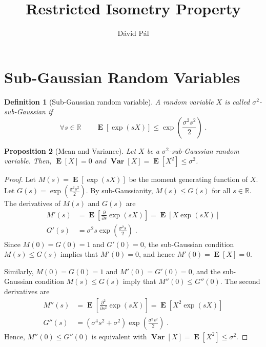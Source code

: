 \documentclass[12pt]{article}
\newtheorem{definition}{Definition}
\newtheorem{proposition}[definition]{Proposition}
\newcommand{\R}{\mathbb{R}}
\DeclareMathOperator*{\Var}{\mathbf{Var}}
\DeclareMathOperator*{\Exp}{\mathbf{E}}
\begin{document}
\title{Restricted Isometry Property}
\author{D\'avid P\'al}
\maketitle

\section{Sub-Gaussian Random Variables}

\begin{definition}[Sub-Gaussian random variable]
A random variable $X$ is called \emph{$\sigma^2$-sub-Gaussian} if
$$
\forall s \in \R \qquad \Exp\left[ \exp \left( s X \right) \right] \le \exp\left( \frac{\sigma^2 s^2}{2} \right) \; .
$$
\end{definition}

\begin{proposition}[Mean and Variance]
\label{proposition:sub-gaussian-mean-and-variance}
Let $X$ be a $\sigma^2$-sub-Gaussian random variable.
Then, $\Exp[X] = 0$ and $\Var[X] = \Exp[X^2] \le \sigma^2$.
\end{proposition}

\begin{proof}
Let $M(s) = \Exp[\exp(sX)]$ be the moment generating function of $X$.
Let $G(s) = \exp\left( \frac{\sigma^2 s^2}{2} \right)$.
By sub-Gaussianity, $M(s) \le G(s)$ for all $s \in \R$.
The derivatives of $M(s)$ and $G(s)$ are
\begin{align*}
M'(s) & = \Exp\left[ \frac{\partial}{\partial s}  \exp(sX) \right] = \Exp[X \exp(sX)] \\
G'(s) & = \sigma^2 s \exp\left( \frac{\sigma^2 s}{2} \right) \; .
\end{align*}
Since $M(0) = G(0) = 1$ and $G'(0) = 0$, the sub-Gaussian condition $M(s) \le G(s)$
implies that $M'(0) = 0$, and hence $M'(0) = \Exp[X] = 0$.

Similarly, $M(0) = G(0) = 1$ and $M'(0) = G'(0) = 0$, and the sub-Gaussian condition $M(s) \le G(s)$
imply that $M''(0) \le G''(0)$. The second derivatives are
\begin{align*}
M''(s) & = \Exp\left[ \frac{\partial^2}{\partial s^2}  \exp(sX) \right] = \Exp[X^2 \exp(sX)] \\
G''(s) & = (\sigma^4 s^2 + \sigma^2) \exp \left( \frac{\sigma^2 s^2}{2} \right) \; .
\end{align*}
Hence, $M''(0) \le G''(0)$ is equivalent with $\Var[X] = \Exp[X^2] \le \sigma^2$.
\end{proof}
\end{document}
